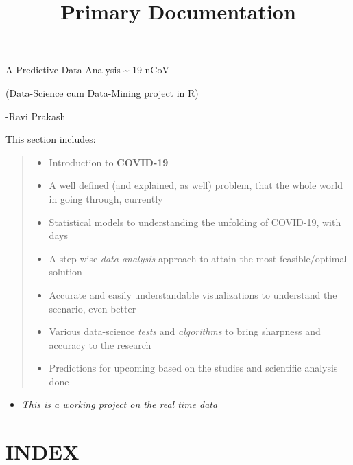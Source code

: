 \documentclass[11pt]{article}
\title{Primary Documentation}
\providecommand{\tightlist}{%
      \setlength{\itemsep}{0pt}\setlength{\parskip}{0pt}}
\begin{document}
    
    \maketitle
    
    

    
    A Predictive Data Analysis \textasciitilde{} 19-nCoV

(Data-Science cum Data-Mining project in R)

 -Ravi Prakash

    This section includes:

    \begin{quote}
\begin{itemize}
\tightlist
\item
  Introduction to \textbf{COVID-19} 
\item
  A well defined (and explained, as well) problem, that the whole world
  in going through, currently 
\item
  Statistical models to understanding the unfolding of COVID-19, with
  days 
\item
  A step-wise \emph{data analysis} approach to attain the most
  feasible/optimal solution 
\item
  Accurate and easily understandable visualizations to understand the
  scenario, even better 
\item
  Various data-science \emph{tests} and \emph{algorithms} to bring
  sharpness and accuracy to the research 
\item
  Predictions for upcoming based on the studies and scientific analysis
  done 
\end{itemize}
\end{quote}

\begin{itemize}
\tightlist
\item
  \emph{This is a working project on the real time data} 
\end{itemize}

    \hypertarget{index}{%
\section{INDEX}\label{index}}
\end{document}
